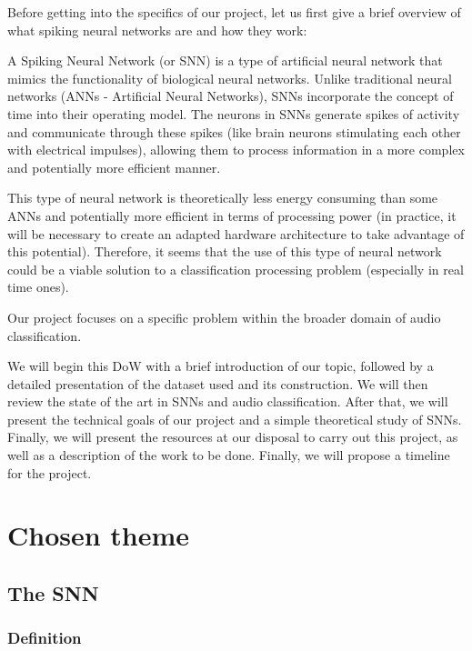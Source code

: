 \documentclass[11pt]{article}
\begin{document}
Before getting into the specifics of our project, let us first give a brief overview of what spiking neural networks are and how they work:

A Spiking Neural Network (or SNN) is a type of artificial neural network that mimics the functionality of biological neural networks. Unlike traditional neural networks (ANNs - Artificial Neural Networks), SNNs incorporate the concept of time into their operating model. The neurons in SNNs generate spikes of activity and communicate through these spikes (like brain neurons stimulating each other with electrical impulses), allowing them to process information in a more complex and potentially more efficient manner.

This type of neural network is theoretically less energy consuming than some ANNs and potentially more efficient in terms of processing power (in practice, it will be necessary to create an adapted hardware architecture to take advantage of this potential). Therefore, it seems that the use of this type of neural network could be a viable solution to a classification processing problem (especially in real time ones).

Our project focuses on a specific problem within the broader domain of audio classification.

We will begin this DoW with a brief introduction of our topic, followed by a detailed presentation of the dataset used and its construction. We will then review the state of the art in SNNs and audio classification. After that, we will present the technical goals of our project and a simple theoretical study of SNNs. Finally, we will present the resources at our disposal to carry out this project, as well as a description of the work to be done. Finally, we will propose a timeline for the project.

\pagebreak

\section{Chosen theme}
\subsection{The SNN}
\subsubsection{Definition}
\end{document}
